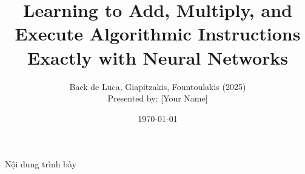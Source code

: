\documentclass[12pt]{beamer}
\title[Exact Learning with NTK]{Learning to Add, Multiply, and Execute Algorithmic Instructions Exactly with Neural Networks}
\author{Back de Luca, Giapitzakis, Fountoulakis (2025)\\[0.3em]\small Presented by: [Your Name]}
\date{\today}
\begin{document}
\begin{frame}
  \titlepage
\end{frame}

\begin{frame}{Nội dung trình bày}
  \tableofcontents
\end{frame}










\end{document}
